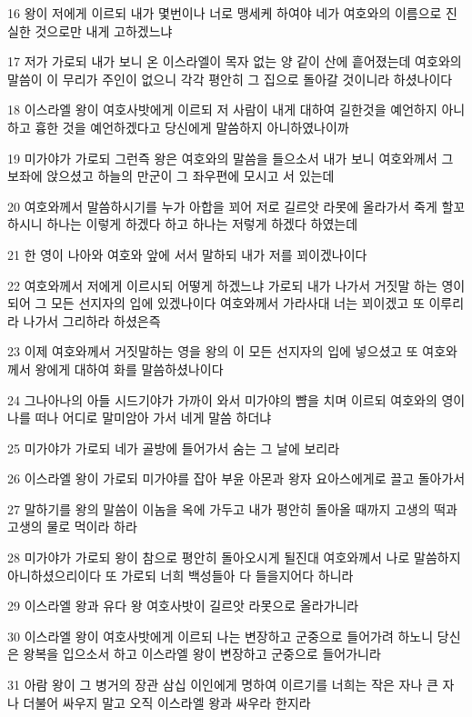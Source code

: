 \par 16 왕이 저에게 이르되 내가 몇번이나 너로 맹세케 하여야 네가 여호와의 이름으로 진실한 것으로만 내게 고하겠느냐
\par 17 저가 가로되 내가 보니 온 이스라엘이 목자 없는 양 같이 산에 흩어졌는데 여호와의 말씀이 이 무리가 주인이 없으니 각각 평안히 그 집으로 돌아갈 것이니라 하셨나이다
\par 18 이스라엘 왕이 여호사밧에게 이르되 저 사람이 내게 대하여 길한것을 예언하지 아니하고 흉한 것을 예언하겠다고 당신에게 말씀하지 아니하였나이까
\par 19 미가야가 가로되 그런즉 왕은 여호와의 말씀을 들으소서 내가 보니 여호와께서 그 보좌에 앉으셨고 하늘의 만군이 그 좌우편에 모시고 서 있는데
\par 20 여호와께서 말씀하시기를 누가 아합을 꾀어 저로 길르앗 라못에 올라가서 죽게 할꼬 하시니 하나는 이렇게 하겠다 하고 하나는 저렇게 하겠다 하였는데
\par 21 한 영이 나아와 여호와 앞에 서서 말하되 내가 저를 꾀이겠나이다
\par 22 여호와께서 저에게 이르시되 어떻게 하겠느냐 가로되 내가 나가서 거짓말 하는 영이 되어 그 모든 선지자의 입에 있겠나이다 여호와께서 가라사대 너는 꾀이겠고 또 이루리라 나가서 그리하라 하셨은즉
\par 23 이제 여호와께서 거짓말하는 영을 왕의 이 모든 선지자의 입에 넣으셨고 또 여호와께서 왕에게 대하여 화를 말씀하셨나이다
\par 24 그나아나의 아들 시드기야가 가까이 와서 미가야의 뺨을 치며 이르되 여호와의 영이 나를 떠나 어디로 말미암아 가서 네게 말씀 하더냐
\par 25 미가야가 가로되 네가 골방에 들어가서 숨는 그 날에 보리라
\par 26 이스라엘 왕이 가로되 미가야를 잡아 부윤 아몬과 왕자 요아스에게로 끌고 돌아가서
\par 27 말하기를 왕의 말씀이 이놈을 옥에 가두고 내가 평안히 돌아올 때까지 고생의 떡과 고생의 물로 먹이라 하라
\par 28 미가야가 가로되 왕이 참으로 평안히 돌아오시게 될진대 여호와께서 나로 말씀하지 아니하셨으리이다 또 가로되 너희 백성들아 다 들을지어다 하니라
\par 29 이스라엘 왕과 유다 왕 여호사밧이 길르앗 라못으로 올라가니라
\par 30 이스라엘 왕이 여호사밧에게 이르되 나는 변장하고 군중으로 들어가려 하노니 당신은 왕복을 입으소서 하고 이스라엘 왕이 변장하고 군중으로 들어가니라
\par 31 아람 왕이 그 병거의 장관 삼십 이인에게 명하여 이르기를 너희는 작은 자나 큰 자나 더불어 싸우지 말고 오직 이스라엘 왕과 싸우라 한지라
